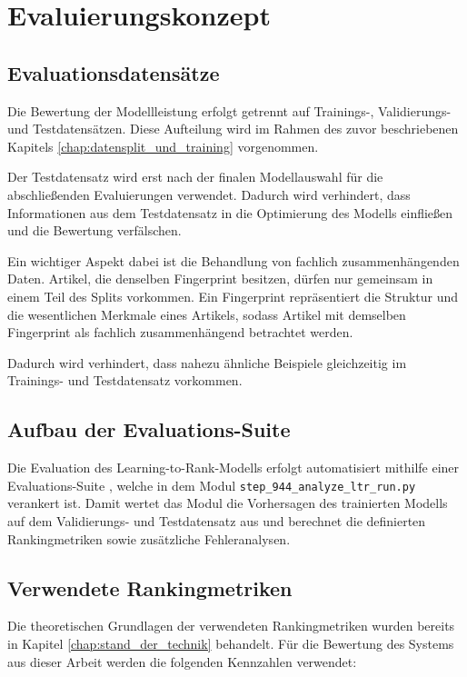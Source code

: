 ﻿\chapter{Evaluierungskonzept}
\label{chap:evaluierungskonzept}

\section{Evaluationsdatensätze}

Die Bewertung der Modellleistung erfolgt getrennt auf Trainings-, Validierungs- und Testdatensätzen.
Diese Aufteilung wird im Rahmen des zuvor beschriebenen Kapitels \ref{chap:datensplit_und_training} vorgenommen.

Der Testdatensatz wird erst nach der finalen Modellauswahl für die abschließenden Evaluierungen verwendet.
Dadurch wird verhindert, dass Informationen aus dem Testdatensatz in die Optimierung des Modells einfließen und die Bewertung verfälschen.

Ein wichtiger Aspekt dabei ist die Behandlung von fachlich zusammenhängenden Daten. Artikel, die denselben Fingerprint besitzen, dürfen nur gemeinsam in einem Teil des Splits vorkommen.
Ein Fingerprint repräsentiert die Struktur und die wesentlichen Merkmale eines Artikels, sodass Artikel mit demselben Fingerprint als fachlich zusammenhängend betrachtet werden.

Dadurch wird verhindert, dass nahezu ähnliche Beispiele gleichzeitig im Trainings- und Testdatensatz vorkommen.

\section{Aufbau der Evaluations-Suite} 

Die Evaluation des Learning-to-Rank-Modells erfolgt automatisiert mithilfe einer Evaluations-Suite \parencite{srcEvalSuite}, welche in dem Modul \texttt{step\_944\_analyze\_ltr\_run.py} verankert ist.
Damit wertet das Modul die Vorhersagen des trainierten Modells auf dem Validierungs- und Testdatensatz aus und berechnet die definierten Rankingmetriken sowie zusätzliche Fehleranalysen.


\section{Verwendete Rankingmetriken} 

Die theoretischen Grundlagen der verwendeten Rankingmetriken wurden bereits in Kapitel \ref{chap:stand_der_technik} behandelt. 
Für die Bewertung des Systems aus dieser Arbeit werden die folgenden Kennzahlen verwendet: 

